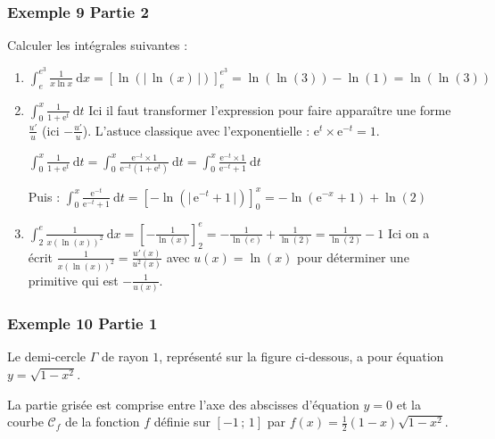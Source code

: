 \documentclass[11pt, hyperref={urlcolor=red,%
            linkcolor=blue, %
            colorlinks=true}]{beamer}
\newcommand {\axes} {
\draw[->,very thick] (\xmin,0) -- (\xmax,0);
\draw[->,very thick] (0,\ymin) -- (0,\ymax);
\draw (0.95*\xmax, 0) node[above] {$x$};
\draw (0, 0.95*\ymax) node[left] {$y$};
}
\newcommand {\fenetre}
{\clip (\xmin,\ymin) rectangle (\xmax,\ymax);}
\newcommand{\Interff}[2]{\left[#1\, ;\, #2\right]}
\newcommand{\courbe}[1]{\ensuremath{\mathcal{C}_{#1}}}
\newcommand{\dx}{\ensuremath{\text{d}x}}		%
\newcommand{\dt}{\ensuremath{\text{d}t}}		%
\newcommand{\valabs}[1]{\big| \, #1 \, \big|}
\begin{document}
\begin{frame}
\frametitle{Exemple  9 Partie 2}
\label{exemple9}

Calculer les intégrales suivantes :

			\begin{enumerate}
						
				\item $\int_{e}^{e^3} \frac{1}{x \ln x} \ \dx = \left[\ln(\valabs{\ln(x)})\right]_{e}^{e^3}=\ln(\ln(3))- \ln(1)=\ln(\ln(3))$
				\item $\int_{0}^{x} \frac{1}{1+\text{e}^t}  \ \dt$ Ici il faut transformer l'expression pour faire apparaître une forme $\frac{u'}{u}$ (ici $-\frac{u'}{u}$). L'astuce classique avec l'exponentielle : $\text{e}^{t}\times \text{e}^{-t}=1$.

$\int_{0}^{x} \frac{1}{1+\text{e}^t}  \ \dt = \int_{0}^{x} \frac{\text{e}^{-t} \times 1}{\text{e}^{-t}(1+\text{e}^t)}  \ \dt =\int_{0}^{x} \frac{\text{e}^{-t} \times 1}{\text{e}^{-t}+1}  \ \dt$

Puis : 	$\int_{0}^{x} \frac{\text{e}^{-t}  }{\text{e}^{-t}+1}  \ \dt=\left[-\ln(\valabs{\text{e}^{-t}+1})\right]_{0}^{x}=-\ln(\text{e}^{-x}+1) + \ln(2)$

				
				\item $\int_{2}^{e} \frac{1}{x(\ln(x))^2}  \ \dx = \left[-\frac{1}{\ln(x)}\right]_{2}^{e}=-\frac{1}{\ln(e)}+\frac{1}{\ln(2)} =\frac{1}{\ln(2)}-1$ Ici on a écrit $\frac{1}{x(\ln(x))^2}=\frac{u'(x)}{u^{2}(x)}$ avec $u(x)=\ln(x)$ pour déterminer une primitive qui est $-\frac{1}{u(x)}$.
			\end{enumerate}

\end{frame}

\begin{frame}
\frametitle{Exemple  10 Partie  1}
\label{exemple10}


Le demi-cercle $\Gamma$ de rayon $1$, représenté sur la figure ci-dessous, a pour équation $y=\sqrt{1-x^2}$.

La partie grisée est comprise entre l'axe des abscisses d'équation $y=0$ et la courbe $\courbe{f}$ de la fonction $f$ définie sur  $\Interff{-1}{1}$ par 	$f(x)=\frac{1}{2}(1-x)\sqrt{1-x^2}$.

\begin{center}
\end{center}

\end{frame}
\end{document}
